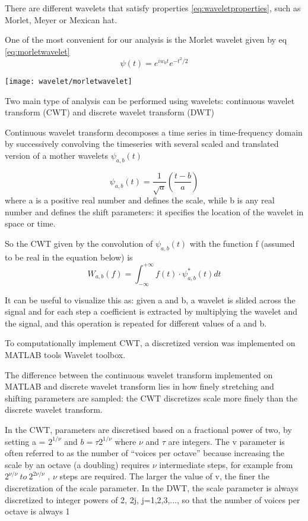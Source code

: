 \documentclass[a4paper,11pt]{article}
\begin{document}
There are different wavelets that satisfy properties \ref{eq:waveletproperties}, such as Morlet, Meyer or Mexican hat.

One of the most convenient for our analysis is the Morlet wavelet given by eq \ref{eq:morletwavelet}
\begin{equation}\label{eq:morletwavelet}
\psi\left(t\right) = e^{iw_0 t}e^{-t^2/2}
\end{equation}

\texttt{[image: wavelet/morletwavelet]}


Two main type of analysis can be performed using wavelets: continuous wavelet transform (CWT) and discrete wavelet transform (DWT)

Continuous wavelet transform decomposes a time series in time-frequency domain by successively convolving the timeseries with several scaled and translated version of a mother wavelets $\psi_{a, b}\left(t\right)$

\begin{equation}
\psi_{a, b}\left(t\right) = \frac{1}{\sqrt{a}}\left(\frac{t-b}{a}\right)
\end{equation}
where a is a positive real number and defines the scale, while b is any real number and defines the shift parameters: it specifies the location of the wavelet in space or time.

So the CWT given by the convolution of $\psi_{a, b}\left(t\right)$  with the function f (assumed to be real in the equation below) is
\begin{equation}
W_{a,b}(f) = \int_{-\infty}^{+\infty}  f(t) \cdot \psi_{a, b}^\ast \left(t\right)   dt
\end{equation}

It can be useful to visualize this as: given a and b, a wavelet is slided across the signal and for each step a coefficient is extracted by multiplying the wavelet and the signal, and this operation is repeated for different values of a and b.

To computationally implement CWT, a discretized version was implemented on MATLAB tools Wavelet toolbox.

The difference between the continuous wavelet transform implemented on MATLAB and discrete wavelet transform lies in how finely stretching and shifting parameters are sampled: the CWT discretizes scale more finely than the discrete wavelet transform.

In the CWT, parameters are discretised based on a fractional power of two, by setting a = $2^{1/\nu}$ and $b = \tau 2^{1/\nu}$ where $\nu$ and $\tau$ are integers. The v parameter is often referred to as the number of “voices per octave” because increasing the scale by an octave (a doubling) requires $\nu$ intermediate steps, for example from $2^{\nu/\nu} \ to \ 2^{2\nu/\nu}$ , $\nu$ steps are required.
The larger the value of v, the finer the discretization of the scale parameter.
In the DWT, the scale parameter is always discretized to integer powers of 2, 2j, j=1,2,3,..., so that the number of voices per octave is always 1
\end{document}
